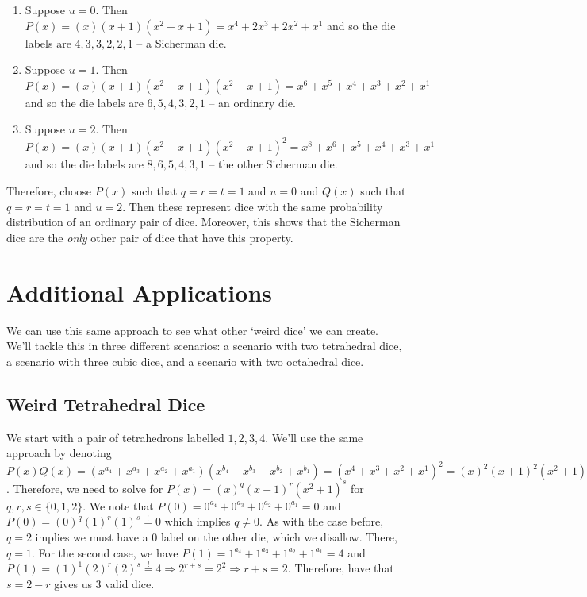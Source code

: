 \documentclass[12pt]{report}
\begin{document}
\begin{enumerate}
\item Suppose $u=0$. Then $P(x)=(x)(x+1)(x^{2}+x+1)=x^{4}+2x^{3}+2x^{2}+x^{1}$ and so the die labels are $4,3,3,2,2,1$ -- a Sicherman die.
\item Suppose $u=1$. Then $P(x)=(x)(x+1)(x^{2}+x+1)(x^{2}-x+1)=x^{6}+x^{5}+x^{4}+x^{3}+x^{2}+x^{1}$ and so the die labels are $6,5,4,3,2,1$ -- an ordinary die.
\item Suppose $u=2$. Then $P(x)=(x)(x+1)(x^{2}+x+1)(x^{2}-x+1)^{2}=x^{8}+x^{6}+x^{5}+x^{4}+x^{3}+x^{1}$ and so the die labels are $8,6,5,4,3,1$ -- the other Sicherman die.
\end{enumerate}

Therefore, choose $P(x)$ such that $q=r=t=1$ and $u=0$ and $Q(x)$ such that $q=r=t=1$ and $u=2$. Then these
represent dice with the same probability distribution of an ordinary pair of dice. Moreover, this shows that
the Sicherman dice are the \textit{only} other pair of dice that have this property.

\section*{Additional Applications}
We can use this same approach to see what other `weird dice' we can create. We'll tackle this in three
different scenarios: a scenario with two tetrahedral dice, a scenario with three cubic dice, and a scenario
with two octahedral dice.

\subsection*{Weird Tetrahedral Dice}
We start with a pair of tetrahedrons labelled $1,2,3,4$. We'll use the same approach by denoting
$P(x)Q(x)=(x^{a_{4}}+x^{a_{3}}+x^{a_{2}}+x^{a_{1}})
(x^{b_{4}}+x^{b_{3}}+x^{b_{2}}+x^{b_{1}})=(x^{4}+x^{3}+x^{2}+x^{1})^{2}=(x)^{2}(x+1)^{2}(x^{2}+1)^{2}$.
Therefore, we need to solve for $P(x)=(x)^{q}(x+1)^{r}(x^{2}+1)^{s}$ for $q,r,s \in \{0,1,2\}$. We note that
$P(0)=0^{a_{4}}+0^{a_{3}}+0^{a_{2}}+0^{a_{1}}=0$ and $P(0)=(0)^{q}(1)^{r}(1)^{s} \stackrel{!}{=} 0$ which
implies $q \neq 0$. As with the case before, $q=2$ implies we must have a 0 label on the other die, which we
disallow. There, $q=1$. For the second case, we have $P(1)=1^{a_{4}}+1^{a_{3}}+1^{a_{2}}+1^{a_{1}}=4$ and
$P(1)=(1)^{1}(2)^{r}(2)^{s} \stackrel{!}{=} 4 \Rightarrow 2^{r+s}=2^{2} \Rightarrow r+s=2$. Therefore, have
that $s=2-r$ gives us 3 valid dice. 
\end{document}
